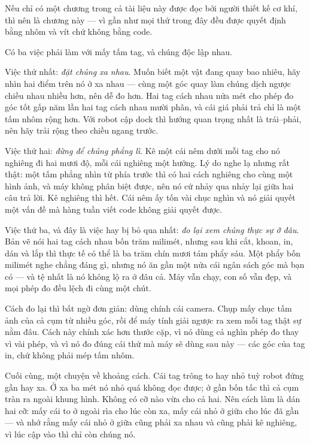 \documentclass[../../marker.tex]{subfiles}
\begin{document}
\begin{dongian}
Nếu chỉ có một chương trong cả tài liệu này được đọc bởi người thiết kế cơ khí, thì nên là chương này --- vì gần như mọi thứ trong đây đều được quyết định bằng nhôm và vít chứ không bằng code.

Có ba việc phải làm với mấy tấm tag, và chúng độc lập nhau.

Việc thứ nhất: \emph{đặt chúng xa nhau}. Muốn biết một vật đang quay bao nhiêu, hãy nhìn hai điểm trên nó ở xa nhau --- cùng một góc quay làm chúng dịch ngược chiều nhau nhiều hơn, nên dễ đo hơn. Hai tag cách nhau nửa mét cho phép đo góc tốt gấp năm lần hai tag cách nhau mười phân, và cái giá phải trả chỉ là một tấm nhôm rộng hơn. Với robot cập dock thì hướng quan trọng nhất là trái--phải, nên hãy trải rộng theo chiều ngang trước.

Việc thứ hai: \emph{đừng để chúng phẳng lì}. Kê một cái nêm dưới mỗi tag cho nó nghiêng đi hai mươi độ, mỗi cái nghiêng một hướng. Lý do nghe lạ nhưng rất thật: một tấm phẳng nhìn từ phía trước thì có hai cách nghiêng cho cùng một hình ảnh, và máy không phân biệt được, nên nó cứ nhảy qua nhảy lại giữa hai câu trả lời. Kê nghiêng thì hết. Cái nêm ấy tốn vài chục nghìn và nó giải quyết một vấn đề mà hàng tuần viết code không giải quyết được.

Việc thứ ba, và đây là việc hay bị bỏ qua nhất: \emph{đo lại xem chúng thực sự ở đâu}. Bản vẽ nói hai tag cách nhau bốn trăm milimét, nhưng sau khi cắt, khoan, in, dán và lắp thì thực tế có thể là ba trăm chín mươi tám phẩy sáu. Một phẩy bốn milimét nghe chẳng đáng gì, nhưng nó ăn gần một nửa cái ngân sách góc mà bạn có --- và tệ nhất là nó không lộ ra ở đâu cả. Máy vẫn chạy, con số vẫn đẹp, và mọi phép đo đều lệch đi cùng một chút.

Cách đo lại thì bất ngờ đơn giản: dùng chính cái camera. Chụp mấy chục tấm ảnh của cả cụm từ nhiều góc, rồi để máy tính giải ngược ra xem mỗi tag thật sự nằm đâu. Cách này chính xác hơn thước cặp, vì nó dùng cả nghìn phép đo thay vì vài phép, và vì nó đo đúng cái thứ mà máy sẽ dùng sau này --- các góc của tag in, chứ không phải mép tấm nhôm.

Cuối cùng, một chuyện về khoảng cách. Cái tag trông to hay nhỏ tuỳ robot đứng gần hay xa. Ở xa ba mét nó nhỏ quá không đọc được; ở gần bốn tấc thì cả cụm tràn ra ngoài khung hình. Không có cỡ nào vừa cho cả hai. Nên cách làm là dán hai cỡ: mấy cái to ở ngoài rìa cho lúc còn xa, mấy cái nhỏ ở giữa cho lúc đã gần --- và nhớ rằng mấy cái nhỏ ở giữa cũng phải xa nhau và cũng phải kê nghiêng, vì lúc cập vào thì chỉ còn chúng nó.

\end{dongian}
\end{document}
